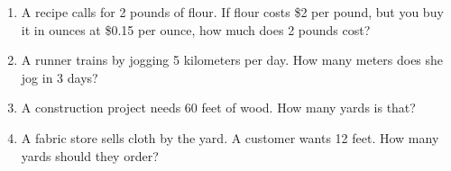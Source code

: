 \documentclass[12pt, letterpaper, fleqn]{article}
\begin{document}
\begin{enumerate}[itemsep=2cm, leftmargin=0.6cm]

\item A recipe calls for 2 pounds of flour. If flour costs \$2 per pound, but you buy it in ounces at \$0.15 per ounce, how much does 2 pounds cost?

\vspace{1.8cm}

\item A runner trains by jogging 5 kilometers per day. How many meters does she jog in 3 days?

\vspace{1.8cm}

\item A construction project needs 60 feet of wood. How many yards is that?

\vspace{1.8cm}

\item A fabric store sells cloth by the yard. A customer wants 12 feet. How many yards should they order?

\vspace{1.8cm}

\end{enumerate}
\end{document}
